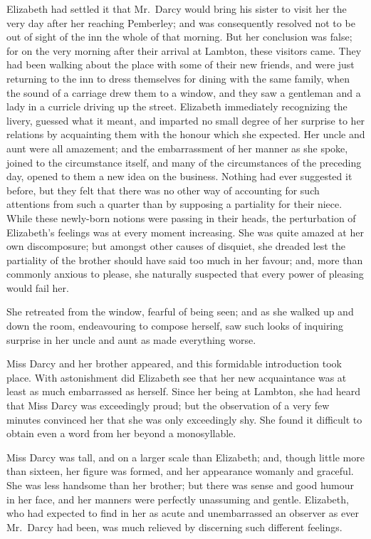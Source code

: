 \documentclass[12pt,english]{book}
\begin{document}
Elizabeth had settled it that Mr.\ Darcy would bring his sister to
visit her the very day after her reaching Pemberley; and was consequently
resolved not to be out of sight of the inn the whole of that morning.
But her conclusion was false; for on the very morning after their
arrival at Lambton, these visitors came. They had been walking about
the place with some of their new friends, and were just returning
to the inn to dress themselves for dining with the same family, when
the sound of a carriage drew them to a window, and they saw a gentleman
and a lady in a curricle driving up the street. Elizabeth immediately
recognizing the livery, guessed what it meant, and imparted no small
degree of her surprise to her relations by acquainting them with the
honour which she expected. Her uncle and aunt were all amazement;
and the embarrassment of her manner as she spoke, joined to the circumstance
itself, and many of the circumstances of the preceding day, opened
to them a new idea on the business. Nothing had ever suggested it
before, but they felt that there was no other way of accounting for
such attentions from such a quarter than by supposing a partiality
for their niece. While these newly-born notions were passing in their
heads, the perturbation of Elizabeth's feelings was at every moment
increasing. She was quite amazed at her own discomposure; but amongst
other causes of disquiet, she dreaded lest the partiality of the brother
should have said too much in her favour; and, more than commonly anxious
to please, she naturally suspected that every power of pleasing would
fail her.

She retreated from the window, fearful of being seen; and as she walked
up and down the room, endeavouring to compose herself, saw such looks
of inquiring surprise in her uncle and aunt as made everything worse.

Miss Darcy and her brother appeared, and this formidable introduction
took place. With astonishment did Elizabeth see that her new acquaintance
was at least as much embarrassed as herself. Since her being at Lambton,
she had heard that Miss Darcy was exceedingly proud; but the observation
of a very few minutes convinced her that she was only exceedingly
shy. She found it difficult to obtain even a word from her beyond
a monosyllable.

Miss Darcy was tall, and on a larger scale than Elizabeth; and, though
little more than sixteen, her figure was formed, and her appearance
womanly and graceful. She was less handsome than her brother; but
there was sense and good humour in her face, and her manners were
perfectly unassuming and gentle. Elizabeth, who had expected to find
in her as acute and unembarrassed an observer as ever Mr.\ Darcy
had been, was much relieved by discerning such different feelings.
\end{document}
